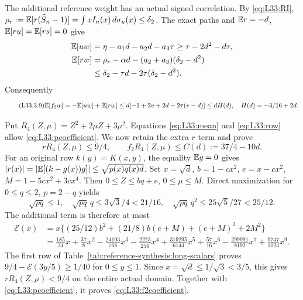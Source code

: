 The additional reference weight has an actual signed correlation.
By \eqref{eq:L33:RI},
$\rho_r:=\mathbb E[r(\widehat S_n-1)]=\int xI_n(x)\,d\sigma_u(x)\le\delta_2$.
The exact paths and $\mathbb E r=-d$, $\mathbb E[ru]=\mathbb E[rs]=0$ give
\[
\begin{aligned}
\mathbb E[uw]&=\eta-a_1d-a_2d-a_3\tau\ge\tau-2d^2-d\tau,\\
\mathbb E[rw]&=\rho_r-\alpha d-(a_2+a_3)(\delta_2-d^2)\\
&\le\delta_2-\tau d-2\tau(\delta_2-d^2).
\end{aligned}
\]
Consequently
\begin{equation}\tag{L33.3.9}\label{eq:L33:covariance}
\mathbb E[f_2w]=-\mathbb E[uw]+\mathbb E[rw]
\le d[-1+2v+2d-2\tau(v-d)]\le dH(d),\quad H(d)=-3/16+2d.
\end{equation}

Put $R_4(Z,\mu)=Z^2+2\mu Z+3\mu^2$. Equations
\eqref{eq:L33:mean} and \eqref{eq:L33:row} allow
\eqref{eq:L33:pcoefficient}. We now retain the extra $r$ term and prove
\begin{equation}\tag{L33.4.1}\label{eq:L33:f2coefficient}
rR_4(Z,\mu)\le9/4,\qquad
f_2R_4(Z,\mu)\le C(d):=37/4-10d.
\end{equation}
For an original row $k(y)=K(x,y)$, the equality $\mathbb E g=0$ gives
$|r(x)|=|\mathbb E[(k-g(x))g]|\le\sqrt{p(x)q(x)d}$.
Set $x=\sqrt d$, $b=1-cx^2$, $e=x-cx^2$,
$M=1-5cx^2+3cx^4$. Then $0\le Z\le bq+e$, $0\le\mu\le M$.
Direct maximization for $0\le q\le2$, $p=2-q$ yields
\[
\sqrt{pq}\le1,\quad \sqrt{pq}\,q\le3\sqrt3/4<21/16,
\quad\sqrt{pq}\,q^2\le25\sqrt5/27<25/12.
\]
The additional term is therefore at most
\begin{align*}
\mathcal E(x)&=x\{(25/12)b^2+(21/8)b(e+M)+(e+M)^2+2M^2\}\\
&=\frac{185}{24}x+\frac{37}{8}x^2-\frac{24103}{768}x^3
-\frac{2223}{256}x^4+\frac{319295}{6144}x^5
+\frac{57}{16}x^6-\frac{299991}{8192}x^7+\frac{9747}{1024}x^9.
\end{align*}
The first row of Table~\ref{tab:reference-synthesis:long-scalars} proves
\(9/4-\mathcal E(3y/5)\ge1/40\) for \(0\le y\le1\).
Since \(x=\sqrt d\le1/\sqrt3<3/5\), this gives
\(rR_4(Z,\mu)<9/4\) on the entire actual domain.
Together with \eqref{eq:L33:pcoefficient}, it proves
\eqref{eq:L33:f2coefficient}.

